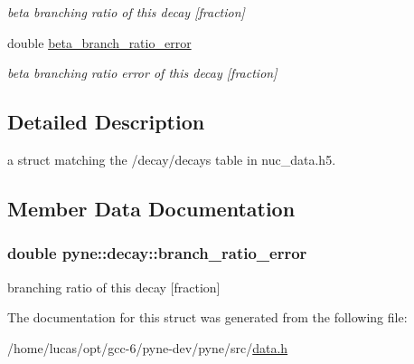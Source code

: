 \begin{DoxyCompactItemize}
\begin{DoxyCompactList}\small\item\em beta branching ratio of this decay \mbox{[}fraction\mbox{]} \end{DoxyCompactList}\item 
double \hyperlink{structpyne_1_1decay_afe2d8be6a39ee1dd7045a1970451f04e}{beta\+\_\+branch\+\_\+ratio\+\_\+error}\hypertarget{structpyne_1_1decay_afe2d8be6a39ee1dd7045a1970451f04e}{}\label{structpyne_1_1decay_afe2d8be6a39ee1dd7045a1970451f04e}

\begin{DoxyCompactList}\small\item\em beta branching ratio error of this decay \mbox{[}fraction\mbox{]} \end{DoxyCompactList}\end{DoxyCompactItemize}


\subsection{Detailed Description}
a struct matching the \textquotesingle{}/decay/decays\textquotesingle{} table in nuc\+\_\+data.\+h5. 

\subsection{Member Data Documentation}
\subsubsection[{\texorpdfstring{branch\+\_\+ratio\+\_\+error}{branch_ratio_error}}]{\setlength{\rightskip}{0pt plus 5cm}double pyne\+::decay\+::branch\+\_\+ratio\+\_\+error}\hypertarget{structpyne_1_1decay_a6df2be5724d68bfe566b53fa71320812}{}\label{structpyne_1_1decay_a6df2be5724d68bfe566b53fa71320812}
branching ratio of this decay \mbox{[}fraction\mbox{]} 

The documentation for this struct was generated from the following file\+:\begin{DoxyCompactItemize}
\item 
/home/lucas/opt/gcc-\/6/pyne-\/dev/pyne/src/\hyperlink{data_8h}{data.\+h}\end{DoxyCompactItemize}
